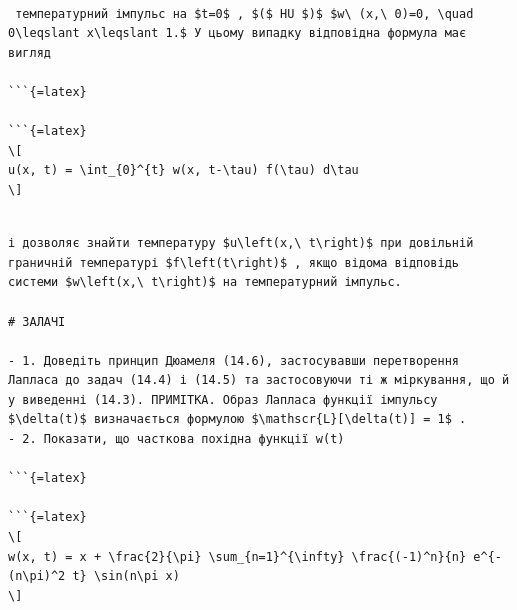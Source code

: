 \documentclass[
]{article}
\begin{document}
\begin{verbatim}

 температурний імпульс на $t=0$ , $($ HU $)$ $w\ (x,\ 0)=0, \quad 0\leqslant x\leqslant 1.$ У цьому випадку відповідна формула має вигляд

```{=latex}

```{=latex}
\[
u(x, t) = \int_{0}^{t} w(x, t-\tau) f(\tau) d\tau
\]
\end{verbatim}

\begin{verbatim}

і дозволяє знайти температуру $u\left(x,\ t\right)$ при довільній граничній температурі $f\left(t\right)$ , якщо відома відповідь системи $w\left(x,\ t\right)$ на температурний імпульс.

# ЗАЛАЧІ

- 1. Доведіть принцип Дюамеля (14.6), застосувавши перетворення Лапласа до задач (14.4) і (14.5) та застосовуючи ті ж міркування, що й у виведенні (14.3). ПРИМІТКА. Образ Лапласа функції імпульсу $\delta(t)$ визначається формулою $\mathscr{L}[\delta(t)] = 1$ .
- 2. Показати, що часткова похідна функції w(t)

```{=latex}

```{=latex}
\[
w(x, t) = x + \frac{2}{\pi} \sum_{n=1}^{\infty} \frac{(-1)^n}{n} e^{-(n\pi)^2 t} \sin(n\pi x)
\]
\end{verbatim}
\end{document}
